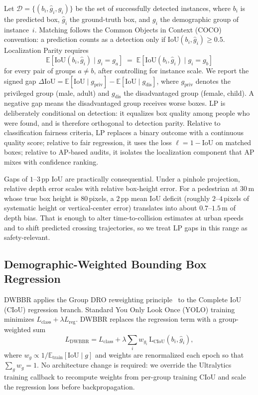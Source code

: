 \documentclass[runningheads]{llncs}
\begin{document}
Let $\mathcal{D}=\{(b_i,\hat{g}_i,g_i)\}$ be the set of successfully detected
instances, where $b_i$ is the predicted box, $\hat{g}_i$ the ground-truth box,
and $g_i$ the demographic group of instance~$i$. Matching follows the Common
Objects in Context (COCO) convention: a prediction counts as a detection only if
$\mathrm{IoU}(b_i,\hat{g}_i)\geq 0.5$. Localization Parity requires
\begin{equation}
\mathbb{E}\!\left[\mathrm{IoU}(b_i,\hat{g}_i)\mid g_i=g_a\right]
\;=\;
\mathbb{E}\!\left[\mathrm{IoU}(b_i,\hat{g}_i)\mid g_i=g_b\right]
\label{eq:lp}
\end{equation}
for every pair of groups $a\neq b$, after controlling for instance scale. We
report the signed gap
$\Delta\mathrm{IoU}
=\mathbb{E}[\mathrm{IoU}\mid g_{\mathrm{priv}}]
-\mathbb{E}[\mathrm{IoU}\mid g_{\mathrm{dis}}]$,
where $g_{\mathrm{priv}}$ denotes the privileged group (male, adult) and
$g_{\mathrm{dis}}$ the disadvantaged group (female, child). A negative gap means
the disadvantaged group receives worse boxes. LP is deliberately conditional on
detection: it equalizes box quality among people who were found, and is therefore
orthogonal to detection parity. Relative to classification fairness criteria,
LP replaces a binary outcome with a continuous quality score; relative to fair
regression, it uses the loss $\ell=1-\mathrm{IoU}$ on matched boxes; relative to
AP-based audits, it isolates the localization component that AP mixes with
confidence ranking.

Gaps of $1$--$3$\,pp IoU are practically consequential. Under a pinhole
projection, relative depth error scales with relative box-height error. For a
pedestrian at $30$\,m whose true box height is $80$\,pixels, a $2$\,pp mean IoU
deficit (roughly $2$--$4$\,pixels of systematic height or vertical-center error)
translates into about $0.7$--$1.5$\,m of depth bias. That is enough to alter
time-to-collision estimates at urban speeds and to shift predicted crossing
trajectories, so we treat LP gaps in this range as safety-relevant.

\subsection{Demographic-Weighted Bounding Box Regression}
\label{sec:dwbbr}

DWBBR applies the Group DRO reweighting principle~\cite{sagawa2020dro} to the
Complete IoU (CIoU) regression branch. Standard You Only Look Once (YOLO)
training minimizes $L_{\mathrm{class}}+\lambda L_{\mathrm{reg}}$. DWBBR replaces
the regression term with a group-weighted sum
\begin{equation}
L_{\mathrm{DWBBR}}
= L_{\mathrm{class}}
+ \lambda\sum_i w_{g_i}\,\mathrm{L}_{\mathrm{CIoU}}(b_i,\hat{g}_i),
\label{eq:dwbbr}
\end{equation}
where $w_g \propto 1/\mathbb{E}_{\mathrm{train}}[\mathrm{IoU}\mid g]$ and
weights are renormalized each epoch so that $\sum_g w_g=1$. No architecture
change is required: we override the Ultralytics training callback to recompute
weights from per-group training CIoU and scale the regression loss before
backpropagation.
\end{document}
